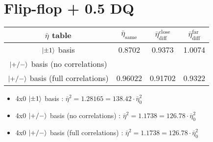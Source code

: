 \documentclass[a4paper]{article}
\begin{document}
\section{Flip-flop + 0.5 DQ}
\begin{tabular}{cccc}

\hline
$\bar{\eta}$ table & $\bar{\eta}_\textrm{same}$ & $\bar{\eta}_\textrm{diff}^\textrm{close}$ & $\bar{\eta}_\textrm{diff}^\textrm{far}$ \\
\hline
$\ket{\pm 1}$ basis & 0.8702 & 0.9373 & 1.0074 \\
$\ket{+/-}$ basis (no correlations) &   &  &  \\
$\ket{+/-}$ basis (full correlations) & 0.96022 & 0.91702 & 0.9322 \\
\hline
\end{tabular}
\begin{itemize}
\item 4x0 $\ket{\pm 1}$ basis : $\bar{\eta}^2 = 1.28165 = 138.42 \cdot \bar{\eta}^2_0$
\item 4x0 $\ket{+/-}$ basis (no correlations) : $\bar{\eta}^2 = 1.1738 = 126.78 \cdot \bar{\eta}^2_0$
\item 4x0 $\ket{+/-}$ basis (full correlations) : $\bar{\eta}^2 = 1.1738 = 126.78 \cdot \bar{\eta}^2_0$
\end{itemize}
\end{document}
